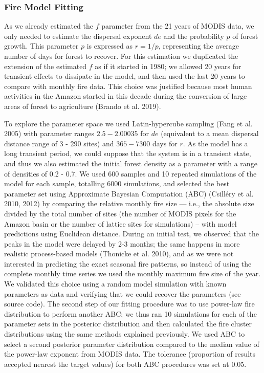 \documentclass[
]{article}
\begin{document}
\subsubsection{Fire Model Fitting}\label{fire-model-fitting}

As we already estimated the \(f\) parameter from the 21 years of MODIS
data, we only needed to estimate the dispersal exponent \(de\) and the
probability \(p\) of forest growth. This parameter \(p\) is expressed as
\(r=1/p\), representing the average number of days for forest to
recover. For this estimation we duplicated the extension of the
estimated \(f\) as if it started in 1980; we allowed 20 years for
transient effects to dissipate in the model, and then used the last 20
years to compare with monthly fire data. This choice was justified
because most human activities in the Amazon started in this decade
during the conversion of large areas of forest to agriculture (Brando et
al. 2019).

To explore the parameter space we used Latin-hypercube sampling (Fang et
al. 2005) with parameter ranges \(2.5 - 2.00035\) for \(de\) (equivalent
to a mean dispersal distance range of 3 - 290 sites) and \(365 - 7300\)
days for \(r\). As the model has a long transient period, we could
suppose that the system is in a transient state, and thus we also
estimated the initial forest density as a parameter with a range of
densities of 0.2 - 0.7. We used 600 samples and 10 repeated simulations
of the model for each sample, totalling 6000 simulations, and selected
the best parameter set using Approximate Bayesian Computation (ABC)
(Csilléry et al. 2010, 2012) by comparing the relative monthly fire size
--- i.e., the absolute size divided by the total number of sites (the
number of MODIS pixels for the Amazon basin or the number of lattice
sites for simulations) -- with model predictions using Euclidean
distance. During an initial test, we observed that the peaks in the
model were delayed by 2-3 months; the same happens in more realistic
process-based models (Thonicke et al. 2010), and as we were not
interested in predicting the exact seasonal fire patterns, so instead of
using the complete monthly time series we used the monthly maximum fire
size of the year. We validated this choice using a random model
simulation with known parameters as data and verifying that we could
recover the parameters (see source code). The second step of our fitting
procedure was to use power-law fire distribution to perform another ABC;
we thus ran 10 simulations for each of the parameter sets in the
posterior distribution and then calculated the fire cluster
distributions using the same methods explained previously. We used ABC
to select a second posterior parameter distribution compared to the
median value of the power-law exponent from MODIS data. The tolerance
(proportion of results accepted nearest the target values) for both ABC
procedures was set at 0.05.
\end{document}
